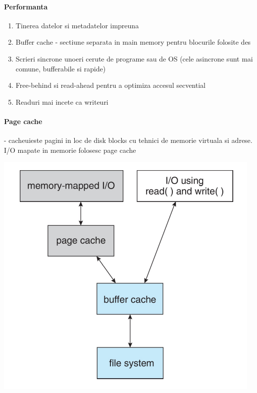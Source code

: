 \documentclass{article}
\begin{document}
\paragraph*{Performanta}
\begin{enumerate}
    \item Tinerea datelor si metadatelor impreuna
    \item Buffer cache - sectiune separata in main memory pentru blocurile folosite des
    \item Scrieri sincrone unoeri cerute de programe sau de OS (cele asincrone sunt mai comune, bufferabile si rapide)
    \item Free-behind si read-ahead pentru a optimiza accesul secvential
    \item Readuri mai incete ca writeuri
\end{enumerate}

\paragraph*{Page cache} - cacheuieste pagini in loc de disk blocks cu tehnici de memorie virtuala si adrese. I/O mapate in memorie folosesc page cache
\begin{center}
    \includegraphics[scale=0.4]{50-pagecache.png}
\end{center}
\end{document}
